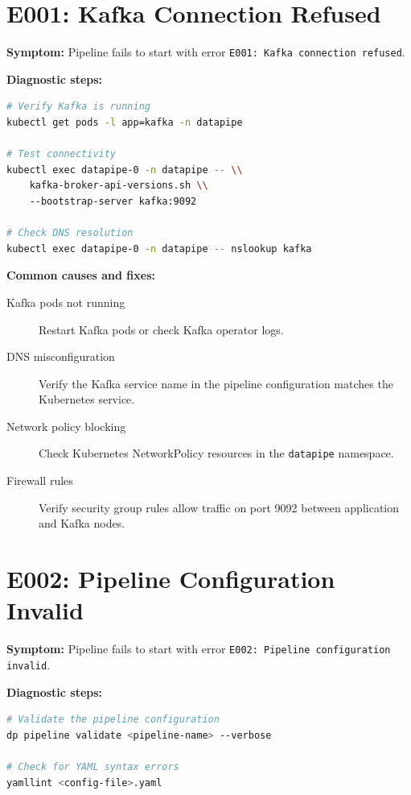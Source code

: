 \documentclass[
    language=english,
    doctype=manual,
    institution=none,
    titlestyle=book,
    oneside,
]{../../omnilatex}
\begin{document}
\section{E001: Kafka Connection Refused}
\label{sec:e001}

\textbf{Symptom:} Pipeline fails to start with error
\texttt{E001: Kafka connection refused}.

\textbf{Diagnostic steps:}

\begin{lstlisting}[language=bash]
# Verify Kafka is running
kubectl get pods -l app=kafka -n datapipe

# Test connectivity
kubectl exec datapipe-0 -n datapipe -- \\
    kafka-broker-api-versions.sh \\
    --bootstrap-server kafka:9092

# Check DNS resolution
kubectl exec datapipe-0 -n datapipe -- nslookup kafka
\end{lstlisting}

\textbf{Common causes and fixes:}

\begin{description}
    \item[Kafka pods not running] Restart Kafka pods or check
        Kafka operator logs.
    \item[DNS misconfiguration] Verify the Kafka service name in the
        pipeline configuration matches the Kubernetes service.
    \item[Network policy blocking] Check Kubernetes NetworkPolicy
        resources in the \texttt{datapipe} namespace.
    \item[Firewall rules] Verify security group rules allow traffic
        on port 9092 between application and Kafka nodes.
\end{description}

\section{E002: Pipeline Configuration Invalid}
\label{sec:e002}

\textbf{Symptom:} Pipeline fails to start with error
\texttt{E002: Pipeline configuration invalid}.

\textbf{Diagnostic steps:}

\begin{lstlisting}[language=bash]
# Validate the pipeline configuration
dp pipeline validate <pipeline-name> --verbose

# Check for YAML syntax errors
yamllint <config-file>.yaml
\end{lstlisting}
\end{document}
